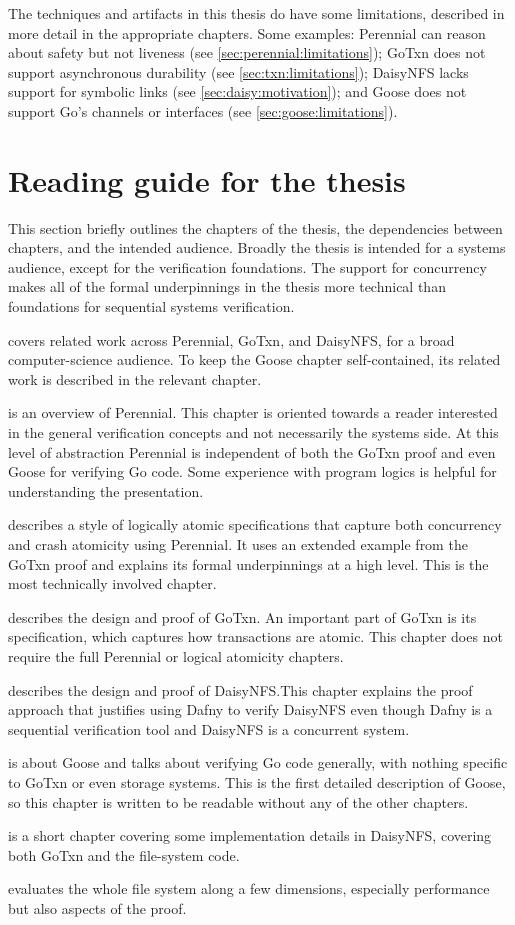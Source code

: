 The techniques and artifacts in this thesis do have some limitations, described
in more detail in the appropriate chapters. Some examples: Perennial can reason
about safety but not liveness (see \cref{sec:perennial:limitations}); GoTxn does
not support asynchronous durability (see \cref{sec:txn:limitations}); DaisyNFS
lacks support for symbolic links (see \cref{sec:daisy:motivation}); and Goose
does not support Go's channels or interfaces (see \cref{sec:goose:limitations}).

\section{Reading guide for the thesis}
\label{sec:intro:reading-guide}

This section briefly outlines the chapters of the thesis, the dependencies
between chapters, and the intended audience. Broadly the thesis is intended for
a systems audience, except for the verification foundations. The support for
concurrency makes all of the formal underpinnings in the thesis more technical
than foundations for sequential systems verification.

 covers related work across Perennial, GoTxn, and DaisyNFS, for
a broad computer-science audience. To keep the Goose chapter self-contained, its
related work is described in the relevant chapter.

 is an overview of Perennial. This chapter is oriented
towards a reader interested in the general verification concepts and not
necessarily the systems side. At this level of abstraction Perennial is
independent of both the GoTxn proof and even Goose for verifying Go code. Some
experience with program logics is helpful for understanding the presentation.

 describes a style of logically atomic specifications
that capture both concurrency and crash atomicity using Perennial. It uses an
extended example from the GoTxn proof and explains its formal underpinnings at a
high level. This is the most technically involved chapter.

 describes the design and proof of GoTxn. An important part of GoTxn is its
specification, which captures how transactions are atomic. This chapter does not
require the full Perennial or logical atomicity chapters.

 describes the design and proof of DaisyNFS.\@ This chapter
explains the proof approach that justifies using Dafny to verify DaisyNFS even
though Dafny is a sequential verification tool and DaisyNFS is a concurrent
system.

 is about Goose and talks about verifying Go code generally, with
nothing specific to GoTxn or even storage systems. This is the first detailed
description of Goose, so this chapter is written to be readable without any of
the other chapters.

 is a short chapter covering some implementation details in
DaisyNFS, covering both GoTxn and the file-system code.

 evaluates the whole file system along a few dimensions,
especially performance but also aspects of the proof.
